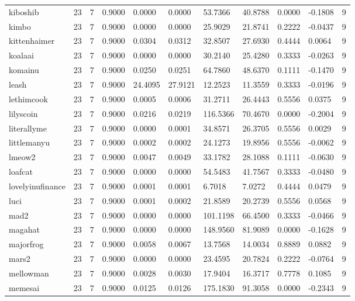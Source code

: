 \begin{table}[htbp]
\begin{tabular}{lllllllllll}
kiboshib & 23 & 7 & 0.9000 & 0.0000 & 0.0000 & 53.7366 & 40.8788 & 0.0000 & -0.1808 & 9 \\
kimbo & 23 & 7 & 0.9000 & 0.0000 & 0.0000 & 25.9029 & 21.8741 & 0.2222 & -0.0437 & 9 \\
kittenhaimer & 23 & 7 & 0.9000 & 0.0304 & 0.0312 & 32.8507 & 27.6930 & 0.4444 & 0.0064 & 9 \\
koalaai & 23 & 7 & 0.9000 & 0.0000 & 0.0000 & 30.2140 & 25.4280 & 0.3333 & -0.0263 & 9 \\
komainu & 23 & 7 & 0.9000 & 0.0250 & 0.0251 & 64.7860 & 48.6370 & 0.1111 & -0.1470 & 9 \\
leash & 23 & 7 & 0.9000 & 24.4095 & 27.9121 & 12.2523 & 11.3559 & 0.3333 & -0.0196 & 9 \\
lethimcook & 23 & 7 & 0.9000 & 0.0005 & 0.0006 & 31.2711 & 26.4443 & 0.5556 & 0.0375 & 9 \\
lilyscoin & 23 & 7 & 0.9000 & 0.0216 & 0.0219 & 116.5366 & 70.4670 & 0.0000 & -0.2004 & 9 \\
literallyme & 23 & 7 & 0.9000 & 0.0000 & 0.0001 & 34.8571 & 26.3705 & 0.5556 & 0.0029 & 9 \\
littlemanyu & 23 & 7 & 0.9000 & 0.0002 & 0.0002 & 24.1273 & 19.8956 & 0.5556 & -0.0062 & 9 \\
lmeow2 & 23 & 7 & 0.9000 & 0.0047 & 0.0049 & 33.1782 & 28.1088 & 0.1111 & -0.0630 & 9 \\
loafcat & 23 & 7 & 0.9000 & 0.0000 & 0.0000 & 54.5483 & 41.7567 & 0.3333 & -0.0480 & 9 \\
lovelyinufinance & 23 & 7 & 0.9000 & 0.0001 & 0.0001 & 6.7018 & 7.0272 & 0.4444 & 0.0479 & 9 \\
luci & 23 & 7 & 0.9000 & 0.0001 & 0.0002 & 21.8589 & 20.2739 & 0.5556 & 0.0568 & 9 \\
mad2 & 23 & 7 & 0.9000 & 0.0000 & 0.0000 & 101.1198 & 66.4500 & 0.3333 & -0.0466 & 9 \\
magahat & 23 & 7 & 0.9000 & 0.0000 & 0.0000 & 148.9560 & 81.9089 & 0.0000 & -0.1628 & 9 \\
majorfrog & 23 & 7 & 0.9000 & 0.0058 & 0.0067 & 13.7568 & 14.0034 & 0.8889 & 0.0882 & 9 \\
mars2 & 23 & 7 & 0.9000 & 0.0000 & 0.0000 & 23.4595 & 20.7824 & 0.2222 & -0.0764 & 9 \\
mellowman & 23 & 7 & 0.9000 & 0.0028 & 0.0030 & 17.9404 & 16.3717 & 0.7778 & 0.1085 & 9 \\
memesai & 23 & 7 & 0.9000 & 0.0125 & 0.0126 & 175.1830 & 91.3058 & 0.0000 & -0.2343 & 9 \\

\end{tabular}
\end{table}

